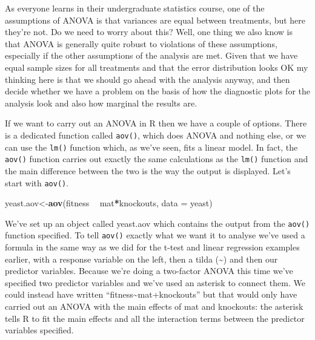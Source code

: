 \documentclass[
]{book}
\newenvironment{Shaded}{\begin{snugshade}}{\end{snugshade}}
\newcommand{\DataTypeTok}[1]{\textcolor[rgb]{0.13,0.29,0.53}{#1}}
\newcommand{\KeywordTok}[1]{\textcolor[rgb]{0.13,0.29,0.53}{\textbf{#1}}}
\newcommand{\NormalTok}[1]{#1}
\newcommand{\OperatorTok}[1]{\textcolor[rgb]{0.81,0.36,0.00}{\textbf{#1}}}
\newcommand{\StringTok}[1]{\textcolor[rgb]{0.31,0.60,0.02}{#1}}
\begin{document}
As everyone learns in their undergraduate statistics course, one of the assumptions of ANOVA is that variances are equal between treatments, but here they're not. Do we need to worry about this? Well, one thing we also know is that ANOVA is generally quite robust to violations of these assumptions, especially if the other assumptions of the analysis are met. Given that we have equal sample sizes for all treatments and that the error distribution looks OK my thinking here is that we should go ahead with the analysis anyway, and then decide whether we have a problem on the basis of how the diagnostic plots for the analysis look and also how marginal the results are.

If we want to carry out an ANOVA in R then we have a couple of options. There is a dedicated function called \texttt{aov()}, which does ANOVA and nothing else, or we can use the \texttt{lm()} function which, as we've seen, fits a linear model. In fact, the \texttt{aov()} function carries out exactly the same calculations as the \texttt{lm()} function and the main difference between the two is the way the output is displayed. Let's start with \texttt{aov()}.

\begin{Shaded}
\begin{Highlighting}[]
\NormalTok{yeast.aov<-}\KeywordTok{aov}\NormalTok{(fitness }\OperatorTok{~}\StringTok{ }\NormalTok{mat}\OperatorTok{*}\NormalTok{knockouts, }\DataTypeTok{data =}\NormalTok{ yeast)}
\end{Highlighting}
\end{Shaded}

We've set up an object called yeast.aov which contains the output from the \texttt{aov()} function specified. To tell \texttt{aov()} exactly what we want it to analyse we've used a formula in the same way as we did for the t-test and linear regression examples earlier, with a response variable on the left, then a tilda (\textasciitilde) and then our predictor variables. Because we're doing a two-factor ANOVA this time we've specified two predictor variables and we've used an asterisk to connect them. We could instead have written ``fitness\textasciitilde mat+knockouts'' but that would only have carried out an ANOVA with the main effects of mat and knockouts: the asterisk tells R to fit the main effects and all the interaction terms between the predictor variables specified.
\end{document}
